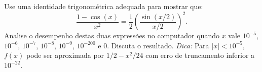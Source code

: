 \begin{exer} Use uma identidade trigonométrica adequada para mostrar que:
  \begin{equation*}
    \frac{1-\cos(x)}{x^2}= \frac{1}{2} \left(\frac{\sin(x/2)}{x/2}\right)^2.
  \end{equation*}
Analise o desempenho destas duas expressões no computador quando $x$ vale $10^{-5}$, $10^{-6}$, $10^{-7}$, $10^{-8}$, $10^{-9}$, $10^{-200}$ e $0$. Discuta o resultado.
\emph{Dica:} Para $|x|<10^{-5}$, $f(x)$ pode ser aproximada por $1/2-x^2/24$ com erro de truncamento inferior a $10^{-22}$.
\end{exer}


